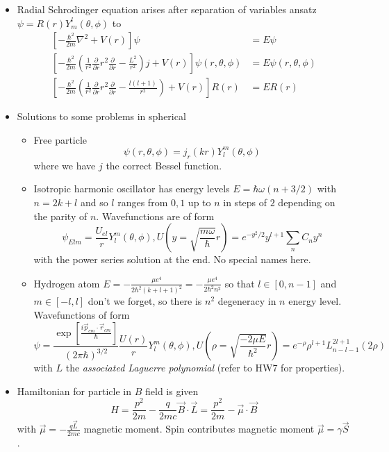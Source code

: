\documentclass[10pt]{report}
\newcommand{\pd}[2]{\frac{\partial #1}{\partial#2}}
\begin{document}
\begin{itemize}
    \item Radial Schrodinger equation arises after separation of variables ansatz $\psi = R(r) Y_{m}^l(\theta,\phi)$ to
        \begin{align*}
            \left[ -\frac{\hbar^2}{2m}\nabla^2 + V(r) \right]\psi &= E\psi\\
            \left[ -\frac{\hbar^2}{2m}\left( \frac{1}{r^2}\pd{}{r}r^2\pd{}{r} - \frac{L^2}{r^2} \right)j+V(r) \right]\psi(r,\theta,\phi) &= E\psi(r,\theta,\phi)\\
            \left[ -\frac{\hbar^2}{2m}\left( \frac{1}{r^2} \pd{}{r}r^2\pd{}{r} - \frac{l(l+1)}{r^2} \right) + V(r) \right]R(r) &= ER(r)
        \end{align*}
    \item Solutions to some problems in spherical
        \begin{itemize}
            \item Free particle
                $$\psi(r,\theta,\phi) = j_r(kr)Y_l^m(\theta,\phi)$$
                where we have $j$ the correct Bessel function.
            \item Isotropic harmonic oscillator has energy levels $E = \hbar \omega(n+3/2)$ with $n=2k+l$ and so $l$ ranges from $0,1$ up to $n$ in steps of $2$ depending on the parity of $n$. Wavefunctions are of form
                $$\psi_{Elm} = \frac{U_{el}}{r}Y_l^m(\theta,\phi), U\left(y= \sqrt{\frac{m\omega}{\hbar}}r \right) = e^{-y^2/2}y^{l+1}\sum_n C_ny^n$$
                with the power series solution at the end. No special names here.
            \item Hydrogen atom $E = -\frac{\mu e^4}{2\hbar^2(k+l+1)^2} = -\frac{\mu e^4}{2\hbar^2n^2}$ so that $l \in [0,n-1]$ and $m \in [-l,l]$ don't we forget, so there is $n^2$ degeneracy in $n$ energy level. Wavefunctions of form
                $$\psi = \frac{\exp \left[ \frac{i\vec{p}_{cm} \cdot \vec{r}_{cm}}{\hbar} \right]}{(2\pi \hbar)^{3/2}}\frac{U(r)}{r}Y_l^m(\theta,\phi), U\left( \rho = \sqrt{\frac{-2\mu E}{\hbar^2}}r \right) = e^{-\rho} \rho^{l+1}L_{n-l-1}^{2l+1}(2\rho)$$
                with $L$ the \emph{associated Laguerre polynomial} (refer to HW7 for properties). 
        \end{itemize}
    \item Hamiltonian for particle in $B$ field is given
        $$H = \frac{p^2}{2m} - \frac{q}{2mc}\vec{B}\cdot \vec{L} = \frac{p^2}{2m} - \vec{\mu} \cdot \vec{B}$$
        with $\vec{\mu} = -\frac{q\vec{L}}{2mc}$ magnetic moment. Spin contributes magnetic moment $\vec{\mu} = \gamma\vec{S}$. 

\end{itemize}
\end{document}
